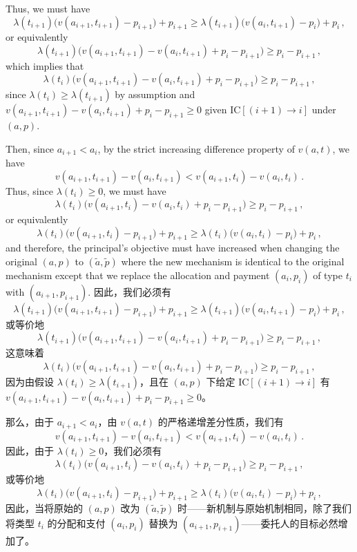 \documentclass[12pt,letterpaper]{article}
\newenvironment{original}{\color{black}\noindent}{}
\newenvironment{translation}{\color{blue}\noindent}{}
\theoremstyle{plain}
\theoremstyle{definition}
\theoremstyle{remark}
\renewcommand{\1}{\mathds{1}}
\theoremstyle{definition}
\begin{document}
\begin{original}
Thus, we must have
\[\lambda(t_{i+1})\big(v(a_{i+1}, t_{i+1}) - p_{i+1}\big) + p_{i+1} \geq  \lambda(t_{i+1})\big(v(a_{i}, t_{i+1}) - p_{i}\big) + p_{i} \,,\]
or equivalently
\[\lambda(t_{i+1})\Big(v(a_{i+1}, t_{i+1}) - v(a_{i}, t_{i+1}) + p_i - p_{i+1}\Big)  \geq   p_{i} -  p_{i+1} \,,\]
which implies that
\[\lambda(t_{i})\Big(v(a_{i+1}, t_{i+1}) - v(a_{i}, t_{i+1}) + p_i - p_{i+1}\Big)  \geq   p_{i} -  p_{i+1} \,,\]
since $\lambda(t_i) \geq \lambda(t_{i+1})$ by assumption and  $v(a_{i+1}, t_{i+1}) - v(a_{i}, t_{i+1}) + p_i - p_{i+1} \geq 0$ given IC$[(i+1)\rightarrow i]$ under $(a, p)$.

Then, since $a_{i+1} < a_i$, by the strict increasing difference property of $v(a, t)$, we have
\[v(a_{i+1}, t_{i+1}) - v(a_{i}, t_{i+1}) < v(a_{i+1}, t_{i}) - v(a_{i}, t_{i})\,.\]
Thus, since $\lambda(t_i) \geq 0$, we must have
\[\lambda(t_{i})\Big(v(a_{i+1}, t_{i}) - v(a_{i}, t_{i}) + p_i - p_{i+1}\Big)  \geq   p_{i} -  p_{i+1} \,,\]
or equivalently
\[\lambda(t_{i})\Big(v(a_{i+1}, t_{i}) - p_{i+1}\Big) + p_{i+1} \geq  \lambda (t_i) \big(v(a_{i}, t_{i}) - p_i\big) + p_{i}  \,,\]
and therefore, the principal's objective must have increased when changing the original $(a, p)$ to $(\tilde{a}, \tilde{p})$ where the new mechanism is identical to the original mechanism except that we replace the allocation and payment $(a_i, p_i)$ of type $t_i$ with $(a_{i+1}, p_{i+1})$.
\end{original}
\begin{translation}
因此，我们必须有
\[\lambda(t_{i+1})\big(v(a_{i+1}, t_{i+1}) - p_{i+1}\big) + p_{i+1} \geq  \lambda(t_{i+1})\big(v(a_{i}, t_{i+1}) - p_{i}\big) + p_{i} \,,\]
或等价地
\[\lambda(t_{i+1})\Big(v(a_{i+1}, t_{i+1}) - v(a_{i}, t_{i+1}) + p_i - p_{i+1}\Big)  \geq   p_{i} -  p_{i+1} \,,\]
这意味着
\[\lambda(t_{i})\Big(v(a_{i+1}, t_{i+1}) - v(a_{i}, t_{i+1}) + p_i - p_{i+1}\Big)  \geq   p_{i} -  p_{i+1} \,,\]
因为由假设 $\lambda(t_i) \geq \lambda(t_{i+1})$，且在 $(a, p)$ 下给定 IC$[(i+1)\rightarrow i]$ 有 $v(a_{i+1}, t_{i+1}) - v(a_{i}, t_{i+1}) + p_i - p_{i+1} \geq 0$。

那么，由于 $a_{i+1} < a_i$，由 $v(a, t)$ 的严格递增差分性质，我们有
\[v(a_{i+1}, t_{i+1}) - v(a_{i}, t_{i+1}) < v(a_{i+1}, t_{i}) - v(a_{i}, t_{i})\,.\]
因此，由于 $\lambda(t_i) \geq 0$，我们必须有
\[\lambda(t_{i})\Big(v(a_{i+1}, t_{i}) - v(a_{i}, t_{i}) + p_i - p_{i+1}\Big)  \geq   p_{i} -  p_{i+1} \,,\]
或等价地
\[\lambda(t_{i})\Big(v(a_{i+1}, t_{i}) - p_{i+1}\Big) + p_{i+1} \geq  \lambda (t_i) \big(v(a_{i}, t_{i}) - p_i\big) + p_{i}  \,,\]
因此，当将原始的 $(a, p)$ 改为 $(\tilde{a}, \tilde{p})$ 时——新机制与原始机制相同，除了我们将类型 $t_i$ 的分配和支付 $(a_i, p_i)$ 替换为 $(a_{i+1}, p_{i+1})$——委托人的目标必然增加了。
\end{translation}
\end{document}
